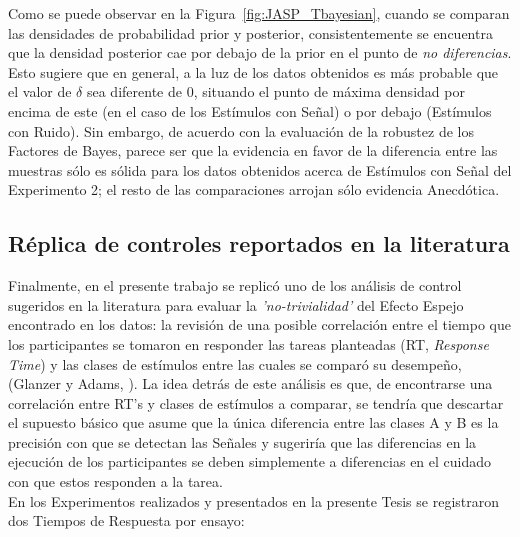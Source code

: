 Como se puede observar en la Figura~\ref{fig:JASP_Tbayesian}, cuando se comparan las densidades de probabilidad prior y posterior, consistentemente se encuentra que la densidad posterior cae por debajo de la prior en el punto de \textit{no diferencias}. Esto sugiere que en general, a la luz de los datos obtenidos es más probable que el valor de $\delta$ sea diferente de $0$, situando el punto de máxima densidad por encima de este (en el caso de los Estímulos con Señal) o por debajo (Estímulos con Ruido). Sin embargo, de acuerdo con la evaluación de la robustez de los Factores de Bayes, parece ser que la evidencia en favor de la diferencia entre las muestras sólo es sólida para los datos obtenidos acerca de Estímulos con Señal del Experimento 2; el resto de las comparaciones arrojan sólo evidencia Anecdótica.\\















\subsection{Réplica de controles reportados en la literatura}

Finalmente, en el presente trabajo se replicó uno de los análisis de control sugeridos en la literatura para evaluar la \textit{'no-trivialidad'} del Efecto Espejo encontrado en los datos: la revisión de una posible correlación entre el tiempo que los participantes se tomaron en responder las tareas planteadas (RT, \textit{Response Time}) y las clases de estímulos entre las cuales se comparó su desempeño, (Glanzer y Adams, \citeyear{Glanzer1990}). La idea detrás de este análisis es que, de encontrarse una correlación entre RT's y clases de estímulos a comparar, se tendría que descartar el supuesto básico que asume que la única diferencia entre las clases A y B es la precisión con que se detectan las Señales y sugeriría que las diferencias en la ejecución de los participantes se deben simplemente a diferencias en el cuidado con que estos responden a la tarea.\\

En los Experimentos realizados y presentados en la presente Tesis se registraron dos Tiempos de Respuesta por ensayo:\\

